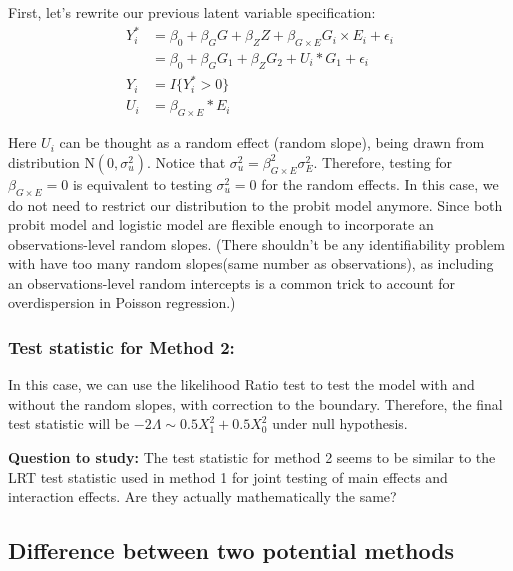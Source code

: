 \documentclass[]{article}
\begin{document}
First, let's rewrite our previous latent variable specification:
\begin{equation}\label{eqn:latentformulationRandomSlope}
\begin{aligned}
Y_i^* &= \beta_0 + \beta_G G + \beta_Z Z + \beta_{G\times E} G_i \times E_i + \epsilon_i \\
      &= \beta_0 + \beta_G G_1 + \beta_Z G_2 + U_i * G_1 + \epsilon_i \\
Y_i &= I\{Y_i^*>0\} \\
U_i &= \beta_{G\times E} * E_i
\end{aligned}
\end{equation}

Here \(U_i\) can be thought as a random effect (random slope), being
drawn from distribution \(\text{N}(0,\sigma_u^2)\). Notice that
\(\sigma_u^2 = \beta_{G\times E}^2 \sigma_E^2\). Therefore, testing for
\(\beta_{G\times E} =0\) is equivalent to testing \(\sigma_u^2 = 0\) for
the random effects. In this case, we do not need to restrict our
distribution to the probit model anymore. Since both probit model and
logistic model are flexible enough to incorporate an observations-level
random slopes. (There shouldn't be any identifiability problem with have
too many random slopes(same number as observations), as including an
observations-level random intercepts is a common trick to account for
overdispersion in Poisson regression.)

\hypertarget{test-statistic-for-method-2}{%
\subsubsection{Test statistic for Method
2:}\label{test-statistic-for-method-2}}

In this case, we can use the likelihood Ratio test to test the model
with and without the random slopes, with correction to the boundary.
Therefore, the final test statistic will be
\(-2\Lambda \sim 0.5X^2_1 + 0.5X^2_0\) under null hypothesis.

\textbf{Question to study:} The test statistic for method 2 seems to be
similar to the LRT test statistic used in method 1 for joint testing of
main effects and interaction effects. Are they actually mathematically
the same?

\hypertarget{difference-between-two-potential-methods}{%
\subsection{Difference between two potential
methods}\label{difference-between-two-potential-methods}}
\end{document}
